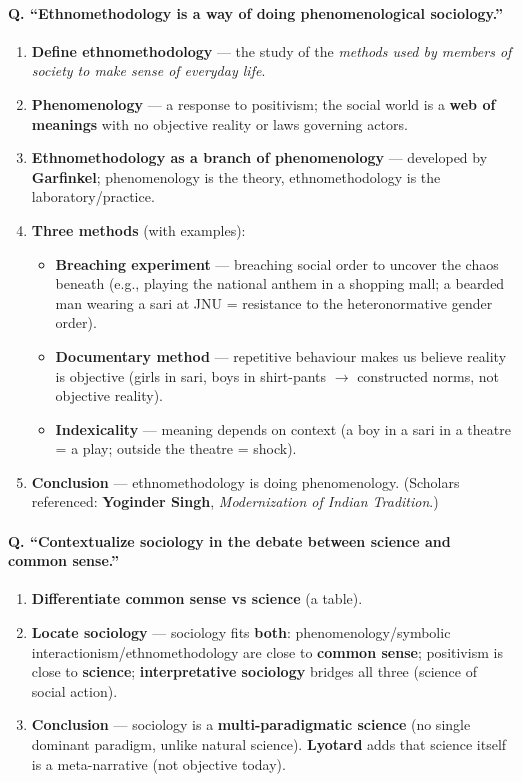 \paragraph{Q. ``Ethnomethodology is a way of doing phenomenological sociology.''}
\begin{enumerate}
\item \textbf{Define ethnomethodology} --- the study of the \textit{methods used by members of society to make sense of everyday life}.
\item \textbf{Phenomenology} --- a response to positivism; the social world is a \textbf{web of meanings} with no objective reality or laws governing actors.
\item \textbf{Ethnomethodology as a branch of phenomenology} --- developed by \textbf{Garfinkel}; phenomenology is the theory, ethnomethodology is the laboratory/practice.
\item \textbf{Three methods} (with examples):
\begin{itemize}
\item \textbf{Breaching experiment} --- breaching social order to uncover the chaos beneath (e.g., playing the national anthem in a shopping mall; a bearded man wearing a sari at JNU = resistance to the heteronormative gender order).
\item \textbf{Documentary method} --- repetitive behaviour makes us believe reality is objective (girls in sari, boys in shirt-pants $\rightarrow$ constructed norms, not objective reality).
\item \textbf{Indexicality} --- meaning depends on context (a boy in a sari in a theatre = a play; outside the theatre = shock).
\end{itemize}
\item \textbf{Conclusion} --- ethnomethodology is doing phenomenology. (Scholars referenced: \textbf{Yoginder Singh}, \textit{Modernization of Indian Tradition}.)
\end{enumerate}

\paragraph{Q. ``Contextualize sociology in the debate between science and common sense.''}
\begin{enumerate}
\item \textbf{Differentiate common sense vs science} (a table).
\item \textbf{Locate sociology} --- sociology fits \textbf{both}: phenomenology/symbolic interactionism/ethnomethodology are close to \textbf{common sense}; positivism is close to \textbf{science}; \textbf{interpretative sociology} bridges all three (science of social action).
\item \textbf{Conclusion} --- sociology is a \textbf{multi-paradigmatic science} (no single dominant paradigm, unlike natural science). \textbf{Lyotard} adds that science itself is a meta-narrative (not objective today).
\end{enumerate}

